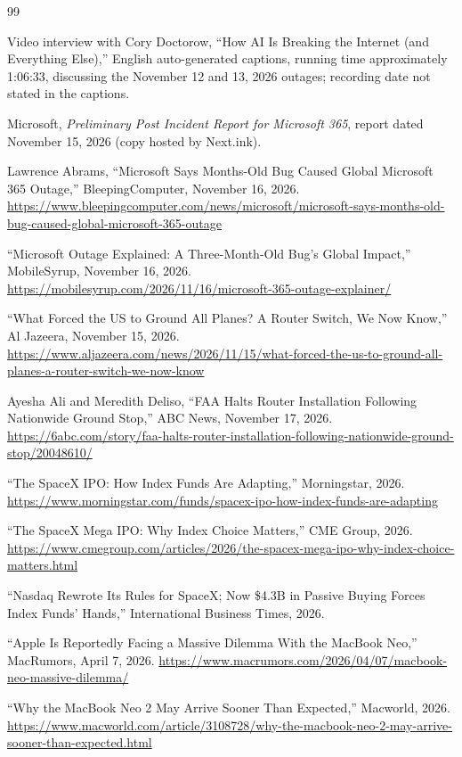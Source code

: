 \documentclass[12pt]{article}
\begin{document}
\begin{thebibliography}{99}

 Video interview with Cory Doctorow, ``How AI Is Breaking the Internet (and Everything Else),'' English auto-generated captions, running time approximately 1:06:33, discussing the November 12 and 13, 2026 outages; recording date not stated in the captions.

 Microsoft, \emph{Preliminary Post Incident Report for Microsoft 365}, report dated November 15, 2026 (copy hosted by Next.ink).

 Lawrence Abrams, ``Microsoft Says Months-Old Bug Caused Global Microsoft 365 Outage,'' BleepingComputer, November 16, 2026. \url{https://www.bleepingcomputer.com/news/microsoft/microsoft-says-months-old-bug-caused-global-microsoft-365-outage}

 ``Microsoft Outage Explained: A Three-Month-Old Bug's Global Impact,'' MobileSyrup, November 16, 2026. \url{https://mobilesyrup.com/2026/11/16/microsoft-365-outage-explainer/}

 ``What Forced the US to Ground All Planes? A Router Switch, We Now Know,'' Al Jazeera, November 15, 2026. \url{https://www.aljazeera.com/news/2026/11/15/what-forced-the-us-to-ground-all-planes-a-router-switch-we-now-know}

 Ayesha Ali and Meredith Deliso, ``FAA Halts Router Installation Following Nationwide Ground Stop,'' ABC News, November 17, 2026. \url{https://6abc.com/story/faa-halts-router-installation-following-nationwide-ground-stop/20048610/}

 ``The SpaceX IPO: How Index Funds Are Adapting,'' Morningstar, 2026. \url{https://www.morningstar.com/funds/spacex-ipo-how-index-funds-are-adapting}

 ``The SpaceX Mega IPO: Why Index Choice Matters,'' CME Group, 2026. \url{https://www.cmegroup.com/articles/2026/the-spacex-mega-ipo-why-index-choice-matters.html}

 ``Nasdaq Rewrote Its Rules for SpaceX; Now \$4.3B in Passive Buying Forces Index Funds' Hands,'' International Business Times, 2026.

 ``Apple Is Reportedly Facing a Massive Dilemma With the MacBook Neo,'' MacRumors, April 7, 2026. \url{https://www.macrumors.com/2026/04/07/macbook-neo-massive-dilemma/}

 ``Why the MacBook Neo 2 May Arrive Sooner Than Expected,'' Macworld, 2026. \url{https://www.macworld.com/article/3108728/why-the-macbook-neo-2-may-arrive-sooner-than-expected.html}


\end{thebibliography}
\end{document}
